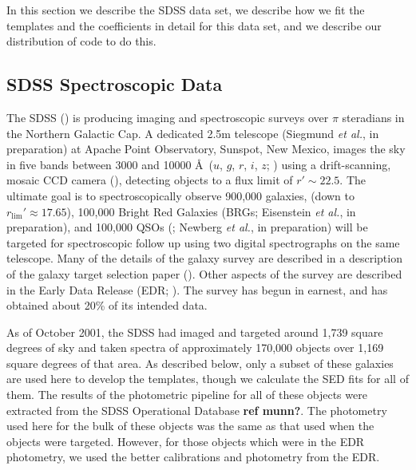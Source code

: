 \documentclass[10pt,preprint]{aastex}
\begin{document}
In this section we describe the SDSS data set, we describe how we fit
the templates and the coefficients in detail for this data set, and we
describe our distribution of code to do this.

\subsection{SDSS Spectroscopic Data}

The SDSS (\citealt{york00a}) is producing imaging and spectroscopic
surveys over $\pi$ steradians in the Northern Galactic Cap. A
dedicated 2.5m telescope (Siegmund {\it et al.}, in preparation) at
Apache Point Observatory, Sunspot, New Mexico, images the sky in five
bands between 3000 and 10000 \AA\ ($u$, $g$, $r$, $i$, $z$;
\citealt{fukugita96a}) using a drift-scanning, mosaic CCD camera
(\citealt{gunn98a}), detecting objects to a flux limit of $r'\sim
22.5$. The ultimate goal is to spectroscopically observe 900,000
galaxies, (down to $r_{\mathrm{lim}}'\approx 17.65$), 100,000 Bright
Red Galaxies (BRGs; Eisenstein {\it et al.}, in preparation), and
100,000 QSOs (\citealt{fan99a}; Newberg {\it et al.}, in preparation)
will be targeted for spectroscopic follow up using two digital
spectrographs on the same telescope. Many of the details of the galaxy
survey are described in a description of the galaxy target selection
paper (\citealt{strauss02a}). Other aspects of the survey are
described in the Early Data Release (EDR; \citealt{stoughton01a}). The
survey has begun in earnest, and has obtained about 20\% of its
intended data.

As of October 2001, the SDSS had imaged and targeted around 1,739
square degrees of sky and taken spectra of approximately 170,000
objects over 1,169 square degrees of that area. As described below,
only a subset of these galaxies are used here to develop the
templates, though we calculate the SED fits for all of them. The
results of the photometric pipeline for all of these objects were
extracted from the SDSS Operational Database {\bf ref munn?}. The
photometry used here for the bulk of these objects was the same as
that used when the objects were targeted.  However, for those objects
which were in the EDR photometry, we used the better calibrations and
photometry from the EDR.
\end{document}
